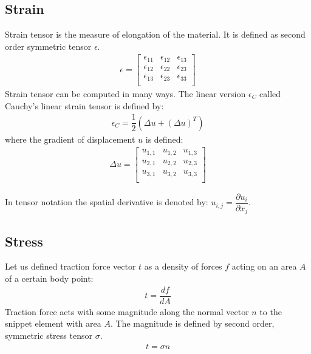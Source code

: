 \documentclass[en]{minipw} %
\begin{document}
\subsection{Strain}
Strain tensor is the measure of elongation of the material. It is defined as second order symmetric tensor $\epsilon$.
\begin{equation}
\begin{aligned}
\epsilon =
\begin{bmatrix}
\epsilon_{11} & \epsilon_{12} & \epsilon_{13} \\
\epsilon_{12} & \epsilon_{22} & \epsilon_{23} \\
\epsilon_{13} & \epsilon_{23} & \epsilon_{33} \\
\end{bmatrix}
\end{aligned}
\end{equation}
Strain tensor can be computed in many ways. The linear version $\epsilon_C$ called Cauchy's linear strain tensor is defined by:
\begin{equation}
\begin{aligned}
\epsilon_C = \dfrac{1}{2}(\Delta u + (\Delta u)^{T})
\end{aligned}
\end{equation}
where the gradient of displacement $u$ is defined:
\begin{equation}
\begin{aligned}
\Delta u =
\begin{bmatrix}
u_{1,1} & u_{1,2} & u_{1,3} \\
u_{2,1} & u_{2,2} & u_{2,3} \\
u_{3,1} & u_{3,2} & u_{3,3} \\
\end{bmatrix}
\end{aligned}
\end{equation}

In tensor notation the spatial derivative is denoted by: $u_{i,j} = \dfrac{\partial u_i}{\partial x_j}$.

\subsection{Stress}
Let us defined traction force vector $t$ as a density of forces $f$ acting on an area $A$ of a certain body point:
\begin{equation}
\begin{aligned}
t = \dfrac{df}{dA}
\end{aligned}
\end{equation}
Traction force acts with some magnitude along the normal vector $n$ to the snippet element with area $A$. The magnitude is defined by second order, symmetric stress tensor $\sigma$.
\begin{equation}
\begin{aligned}
t = \sigma n
\end{aligned}
\end{equation}
\end{document}
